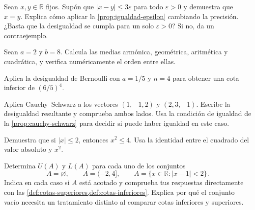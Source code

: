 \begin{samepage}
\begin{problem}
Sean $x,y\in\mathbb{R}$ fijos. Supón que $|x-y|\leq3\varepsilon$ para todo $\varepsilon>0$ y demuestra que $x=y$. Explica cómo aplicar la \cref{prop:igualdad-epsilon} cambiando la precisión. ¿Basta que la desigualdad se cumpla para un solo $\varepsilon>0$? Si no, da un contraejemplo.
\end{problem}
\end{samepage}
\par{}

\begin{samepage}
\begin{problem}
Sean $a=2$ y $b=8$. Calcula las medias armónica, geométrica, aritmética y cuadrática, y verifica numéricamente el orden entre ellas.
\end{problem}
\end{samepage}
\par{}

\begin{samepage}
\begin{problem}
Aplica la desigualdad de Bernoulli con $a=1/5$ y $n=4$ para obtener una cota inferior de $(6/5)^4$.
\end{problem}
\end{samepage}
\par{}

\begin{samepage}
\begin{problem}
Aplica Cauchy--Schwarz a los vectores $(1,-1,2)$ y $(2,3,-1)$. Escribe la desigualdad resultante y comprueba ambos lados.
Usa la condición de igualdad de la \cref{prop:cauchy-schwarz} para decidir si puede haber igualdad en este caso.
\end{problem}
\end{samepage}
\par{}

\begin{samepage}
\begin{problem}
Demuestra que si $|x|\leq2$, entonces $x^2\leq4$. Usa la identidad entre el cuadrado del valor absoluto y $x^2$.
\end{problem}
\end{samepage}
\par{}

\begin{samepage}
\begin{problem}
Determina $U(A)$ y $L(A)$ para cada uno de los conjuntos
\[
A=\varnothing,\qquad A=(-2,4],\qquad
A=\{x\in\mathbb{R}:|x-1|<2\}.
\]
Indica en cada caso si $A$ está acotado y comprueba tus respuestas directamente con las \cref{def:cotas-superiores,def:cotas-inferiores}. Explica por qué el conjunto vacío necesita un tratamiento distinto al comparar cotas inferiores y superiores.
\end{problem}
\end{samepage}
\par{}

